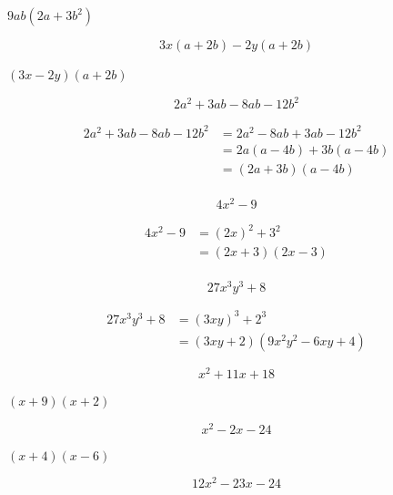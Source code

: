 \documentclass[fleqn,addpoints]{exam}
\begin{document}
\begin{questions}
\begin{solution}[4 cm]
\( 9ab(2a + 3b^2) \)

\end{solution}

\question[5]
\[ 3x(a + 2b) - 2y(a + 2b) \]
\begin{solution}[4 cm]

$(3x - 2y)(a + 2b) $
\end{solution}

\question[5]
\[ 2a^2 + 3ab - 8ab - 12b^2 \]
\begin{solution}[4 cm]

\begin{align*}
  2a^2 + 3ab - 8ab - 12b^2 &= 2a^2 - 8ab + 3ab - 12b^2 \\
  &= 2a(a - 4b) + 3b(a - 4b) \\
  &= (2a + 3b)(a - 4b) \\
\end{align*}

\end{solution}


\question[5]
\[ 4x^2 - 9 \]
\begin{solution}[4 cm]

\begin{align*}
  4x^2 - 9 &= (2x)^2 + 3^2 \\
  &= (2x + 3)(2x - 3) \\
\end{align*}

\end{solution}

\question[5]
\[ 27x^3y^3 + 8 \]
\begin{solution}[4 cm]

\begin{align*}
  27x^3y^3 + 8 &= (3xy)^3 + 2^3 \\
  &= (3xy + 2)(9x^2y^2 - 6xy + 4)
\end{align*}

\end{solution}

\question[5]
\[ x^2 + 11x + 18 \]
\begin{solution}[4 cm]
\( (x + 9)(x + 2) \)
\end{solution}

\question[5]
\[ x^2 - 2x - 24 \]
\begin{solution}[4 cm]
$ (x + 4)(x - 6) $
\end{solution}

\question[5]
\label{factor:last}
\[ 12x^2 - 23x - 24 \]
\begin{solution}[4 cm]


\end{solution}
\end{questions}
\end{document}
